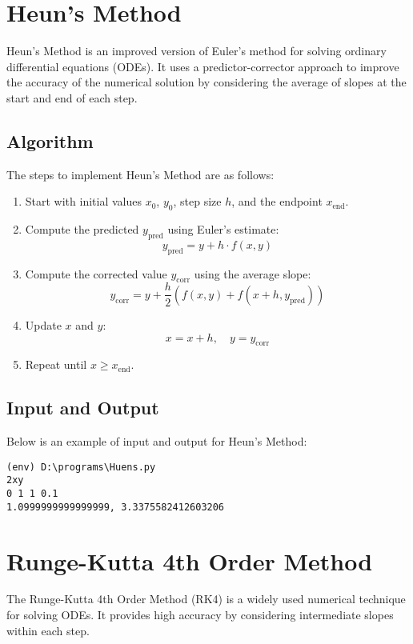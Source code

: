 \documentclass[12pt]{article}
\begin{document}
    \newpage
    \section*{Heun's Method}

Heun's Method is an improved version of Euler's method for solving ordinary differential equations (ODEs). It uses a predictor-corrector approach to improve the accuracy of the numerical solution by considering the average of slopes at the start and end of each step.

\subsection*{Algorithm}
The steps to implement Heun's Method are as follows:
\begin{enumerate}
    \item Start with initial values \(x_0\), \(y_0\), step size \(h\), and the endpoint \(x_{\text{end}}\).
    \item Compute the predicted \(y_{\text{pred}}\) using Euler's estimate:
    \[
    y_{\text{pred}} = y + h \cdot f(x, y)
    \]
    \item Compute the corrected value \(y_{\text{corr}}\) using the average slope:
    \[
    y_{\text{corr}} = y + \frac{h}{2} \left( f(x, y) + f(x + h, y_{\text{pred}}) \right)
    \]
    \item Update \(x\) and \(y\):
    \[
    x = x + h, \quad y = y_{\text{corr}}
    \]
    \item Repeat until \(x \geq x_{\text{end}}\).
\end{enumerate}

\subsection*{Input and Output}
\noindent Below is an example of input and output for Heun's Method:
{\small
\begin{verbatim}
(env) D:\programs\Huens.py
2xy      
0 1 1 0.1
1.0999999999999999, 3.3375582412603206
\end{verbatim}
}

\newpage
\section*{Runge-Kutta 4th Order Method}

The Runge-Kutta 4th Order Method (RK4) is a widely used numerical technique for solving ODEs. It provides high accuracy by considering intermediate slopes within each step.
\end{document}
